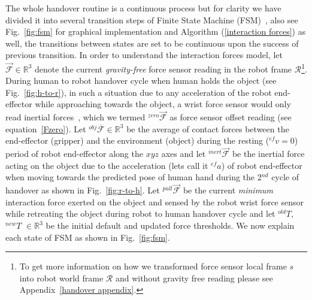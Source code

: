 \documentclass[a4paper, 12pt, oneside]{Thesis}  %
\begin{document}
The whole handover routine is a continuous process but for clarity we have divided it into several transition steps of Finite State Machine (FSM)~\cite{johnson1968automatic}, also see Fig.~\ref{fig:fsm} for graphical implementation and Algorithm (\ref{interaction forces}) as well, the transitions between states are set to be continuous upon the success of previous transition. In order to understand the interaction forces model, let $\mathcal{\vec{F}}\in \mathbb{R}^3$ denote the current \textit{gravity-free} force sensor reading in the robot frame $\mathcal{R}$\footnote{\label{appendixC} To get more information on how we transformed force sensor local frame $s$ into robot world frame $\mathcal{R}$ and without gravity free reading please see Appendix~\ref{handover appendix}.}. During human to robot handover cycle when human holds the object (see Fig.~\ref{fig:h-to-r}), in such a situation due to any acceleration of the robot end-effector while approaching towards the object, a wrist force sensor would only read inertial forces~\cite{spong2008robot}, which we termed ${}^{zero}\vec{\mathcal{F}}$ as force sensor offset reading (see equation~\ref{Fzero}). Let ${}^{obj}\overline{\mathcal{F}}\in \mathbb{R}^3$ be the average of contact forces between the end-effector (gripper) and the environment (object) during the resting (${}^{ef}v=0$) period of robot end-effector along the $xyz$ axes and let ${}^{inert}\vec{\mathcal{F}}$ be the inertial force acting on the object due to the acceleration (lets call it ${}^{ef}a$) of robot end-effector when moving towards the predicted pose of human hand during the 2$^{nd}$ cycle of handover as shown in Fig.~\ref{fig:r-to-h}. Let ${}^{pull}\vec{\mathcal{F}}$ be the current \textit{minimum} interaction force exerted on the object and sensed by the robot wrist force sensor while retreating the object during robot to human handover cycle and let ${}^{old}T$, ${}^{new}T$ $\in \mathbb{R}^3$ be the initial default and updated force thresholds. We now explain each state of FSM as shown in Fig.~\ref{fig:fsm}.
\end{document}
